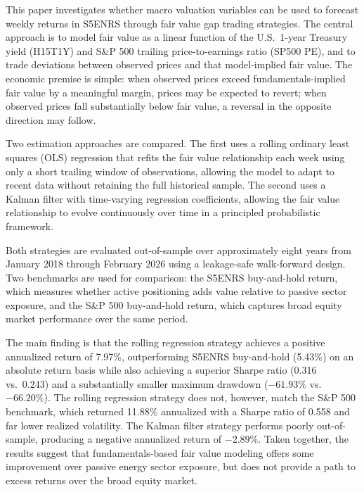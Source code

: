 \documentclass[12pt]{article}
\begin{document}
This paper investigates whether macro valuation variables can be used to forecast weekly returns in S5ENRS through fair value gap trading strategies. The central approach is to model fair value as a linear function of the U.S.\ 1-year Treasury yield (H15T1Y) and S\&P 500 trailing price-to-earnings ratio (SP500 PE), and to trade deviations between observed prices and that model-implied fair value. The economic premise is simple: when observed prices exceed fundamentals-implied fair value by a meaningful margin, prices may be expected to revert; when observed prices fall substantially below fair value, a reversal in the opposite direction may follow.

Two estimation approaches are compared. The first uses a rolling ordinary least squares (OLS) regression that refits the fair value relationship each week using only a short trailing window of observations, allowing the model to adapt to recent data without retaining the full historical sample. The second uses a Kalman filter with time-varying regression coefficients, allowing the fair value relationship to evolve continuously over time in a principled probabilistic framework.

Both strategies are evaluated out-of-sample over approximately eight years from January 2018 through February 2026 using a leakage-safe walk-forward design. Two benchmarks are used for comparison: the S5ENRS buy-and-hold return, which measures whether active positioning adds value relative to passive sector exposure, and the S\&P 500 buy-and-hold return, which captures broad equity market performance over the same period.

The main finding is that the rolling regression strategy achieves a positive annualized return of 7.97\%, outperforming S5ENRS buy-and-hold (5.43\%) on an absolute return basis while also achieving a superior Sharpe ratio (0.316 vs.\ 0.243) and a substantially smaller maximum drawdown ($-61.93\%$ vs.\ $-66.20\%$). The rolling regression strategy does not, however, match the S\&P 500 benchmark, which returned 11.88\% annualized with a Sharpe ratio of 0.558 and far lower realized volatility. The Kalman filter strategy performs poorly out-of-sample, producing a negative annualized return of $-2.89\%$. Taken together, the results suggest that fundamentals-based fair value modeling offers some improvement over passive energy sector exposure, but does not provide a path to excess returns over the broad equity market.

\end{document}

